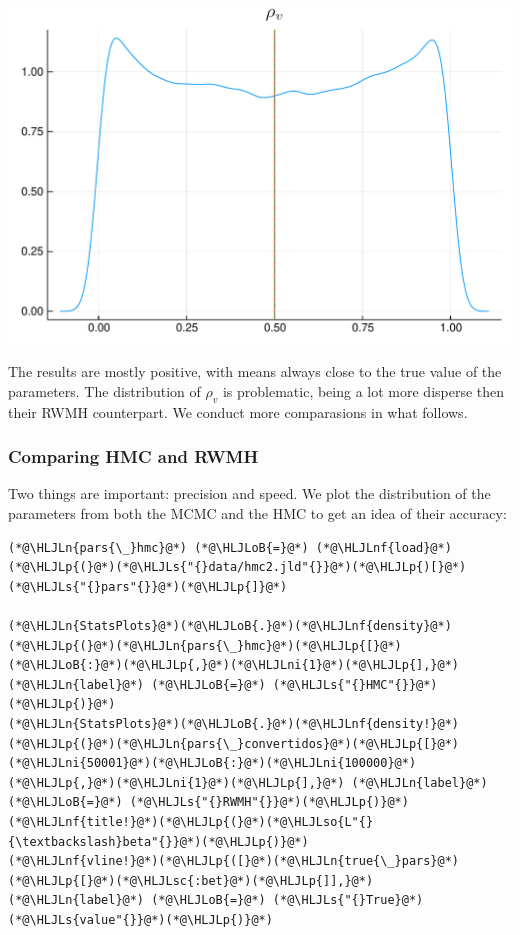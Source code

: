\documentclass[12pt,a4paper]{article}
\newcommand{\HLJLn}[1]{#1}
\newcommand{\HLJLnf}[1]{\textcolor[RGB]{66,102,213}{#1}}
\newcommand{\HLJLs}[1]{\textcolor[RGB]{201,61,57}{#1}}
\newcommand{\HLJLsc}[1]{\textcolor[RGB]{201,61,57}{#1}}
\newcommand{\HLJLso}[1]{\textcolor[RGB]{201,61,57}{#1}}
\newcommand{\HLJLni}[1]{\textcolor[RGB]{59,151,46}{#1}}
\newcommand{\HLJLoB}[1]{\textcolor[RGB]{102,102,102}{\textbf{#1}}}
\newcommand{\HLJLp}[1]{#1}
\begin{document}
\includegraphics[width=\linewidth]{figures/dsge_and_julia_43_1.pdf}

The results are mostly positive, with means always close to the true value of the parameters. The distribution of $\rho_v$ is problematic, being a lot more disperse then their RWMH counterpart. We conduct more comparasions in what follows.

\subsubsection{Comparing HMC and RWMH}
Two things are important: precision and speed. We plot the distribution of the parameters from both the MCMC and the HMC to get an idea of their accuracy:


\begin{lstlisting}
(*@\HLJLn{pars{\_}hmc}@*) (*@\HLJLoB{=}@*) (*@\HLJLnf{load}@*)(*@\HLJLp{(}@*)(*@\HLJLs{"{}data/hmc2.jld"{}}@*)(*@\HLJLp{)[}@*)(*@\HLJLs{"{}pars"{}}@*)(*@\HLJLp{]}@*)

(*@\HLJLn{StatsPlots}@*)(*@\HLJLoB{.}@*)(*@\HLJLnf{density}@*)(*@\HLJLp{(}@*)(*@\HLJLn{pars{\_}hmc}@*)(*@\HLJLp{[}@*)(*@\HLJLoB{:}@*)(*@\HLJLp{,}@*)(*@\HLJLni{1}@*)(*@\HLJLp{],}@*) (*@\HLJLn{label}@*) (*@\HLJLoB{=}@*) (*@\HLJLs{"{}HMC"{}}@*)(*@\HLJLp{)}@*)
(*@\HLJLn{StatsPlots}@*)(*@\HLJLoB{.}@*)(*@\HLJLnf{density!}@*)(*@\HLJLp{(}@*)(*@\HLJLn{pars{\_}convertidos}@*)(*@\HLJLp{[}@*)(*@\HLJLni{50001}@*)(*@\HLJLoB{:}@*)(*@\HLJLni{100000}@*)(*@\HLJLp{,}@*)(*@\HLJLni{1}@*)(*@\HLJLp{],}@*) (*@\HLJLn{label}@*) (*@\HLJLoB{=}@*) (*@\HLJLs{"{}RWMH"{}}@*)(*@\HLJLp{)}@*)
(*@\HLJLnf{title!}@*)(*@\HLJLp{(}@*)(*@\HLJLso{L"{}{\textbackslash}beta"{}}@*)(*@\HLJLp{)}@*)
(*@\HLJLnf{vline!}@*)(*@\HLJLp{([}@*)(*@\HLJLn{true{\_}pars}@*)(*@\HLJLp{[}@*)(*@\HLJLsc{:bet}@*)(*@\HLJLp{]],}@*) (*@\HLJLn{label}@*) (*@\HLJLoB{=}@*) (*@\HLJLs{"{}True}@*) (*@\HLJLs{value"{}}@*)(*@\HLJLp{)}@*)
\end{lstlisting}
\end{document}
